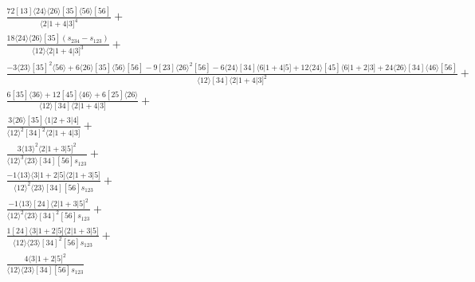 \documentclass[varwidth, border=5pt]{standalone}
\begin{document}
\begin{my}
$\begin{gathered}
\scriptscriptstyle\frac{72[13]⟨24⟩⟨26⟩[35]⟨56⟩[56]}{⟨2|1+4|3]^4}+\\
\scriptscriptstyle\frac{18⟨24⟩⟨26⟩[35](s_{234}-s_{123})}{⟨12⟩⟨2|1+4|3]^3}+\\
\scriptscriptstyle\frac{-3⟨23⟩[35]^2⟨56⟩+6⟨26⟩[35]⟨56⟩[56]-9[23]⟨26⟩^2[56]-6⟨24⟩[34]⟨6|1+4|5]+12⟨24⟩[45]⟨6|1+2|3]+24⟨26⟩[34]⟨46⟩[56]}{⟨12⟩[34]⟨2|1+4|3]^2}+\\
\scriptscriptstyle\frac{6[35]⟨36⟩+12[45]⟨46⟩+6[25]⟨26⟩}{⟨12⟩[34]⟨2|1+4|3]}+\\
\scriptscriptstyle\frac{3⟨26⟩[35]⟨1|2+3|4]}{⟨12⟩^2[34]^2⟨2|1+4|3]}+\\
\scriptscriptstyle\frac{3⟨13⟩^2⟨2|1+3|5]^2}{⟨12⟩^3⟨23⟩[34][56]s_{123}}+\\
\scriptscriptstyle\frac{-1⟨13⟩⟨3|1+2|5]⟨2|1+3|5]}{⟨12⟩^2⟨23⟩[34][56]s_{123}}+\\
\scriptscriptstyle\frac{-1⟨13⟩[24]⟨2|1+3|5]^2}{⟨12⟩^2⟨23⟩[34]^2[56]s_{123}}+\\
\scriptscriptstyle\frac{1[24]⟨3|1+2|5]⟨2|1+3|5]}{⟨12⟩⟨23⟩[34]^2[56]s_{123}}+\\
\scriptscriptstyle\frac{4⟨3|1+2|5]^2}{⟨12⟩⟨23⟩[34][56]s_{123}}\phantom{+}
\end{gathered}$
\end{my}
\end{document}
